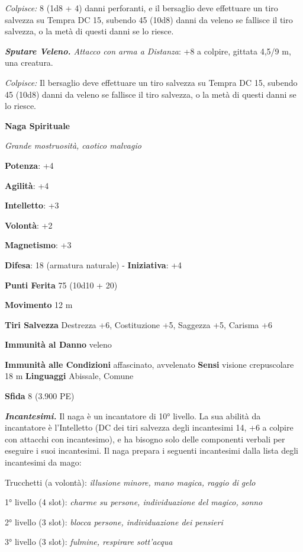 \begin{multicols}{2}
\emph{Colpisce:} 8 (1d8 + 4) danni perforanti, e il bersaglio deve
effettuare un tiro salvezza su Tempra DC 15, subendo 45 (10d8)
danni da veleno se fallisce il tiro salvezza, o la metà di questi danni
se lo riesce.

\emph{\textbf{Sputare Veleno.} Attacco con arma a Distanza}: +8 a
colpire, gittata 4,5/9 m, una creatura.

\emph{Colpisce:} Il bersaglio deve effettuare un tiro salvezza su Tempra DC 15, subendo 45 (10d8) danni da veleno se fallisce il
tiro salvezza, o la metà di questi danni se lo riesce.

\textbf{Naga Spirituale}

\emph{Grande mostruosità, caotico malvagio}

\textbf{Potenza}: +4

\textbf{Agilità}: +4

\textbf{Intelletto}: +3

\textbf{Volontà}: +2

\textbf{Magnetismo}: +3

\textbf{Difesa}: 18 (armatura naturale) - \textbf{Iniziativa}: +4

\textbf{Punti Ferita} 75 (10d10 + 20)

\textbf{Movimento} 12 m

\textbf{Tiri Salvezza} Destrezza +6, Costituzione +5, Saggezza +5,
Carisma +6

\textbf{Immunità al Danno} veleno

\textbf{Immunità alle Condizioni} affascinato, avvelenato \textbf{Sensi}
visione crepuscolare 18 m \textbf{Linguaggi} Abissale,
Comune

\textbf{Sfida} 8 (3.900 PE)

\emph{\textbf{Incantesimi.}} Il naga è un incantatore di 10° livello. La
sua abilità da incantatore è l'Intelletto (DC dei tiri salvezza degli
incantesimi 14, +6 a colpire con attacchi con incantesimo), e ha bisogno
solo delle componenti verbali per eseguire i suoi incantesimi. Il naga
prepara i seguenti incantesimi dalla lista degli incantesimi da mago:

Trucchetti (a volontà): \emph{illusione minore, mano magica, raggio di}
\emph{gelo}

1° livello (4 slot): \emph{charme su persone, individuazione del
magico,} \emph{sonno}

2° livello (3 slot): \emph{blocca persone, individuazione dei pensieri}

3° livello (3 slot): \emph{fulmine, respirare sott'acqua}


\end{multicols}
